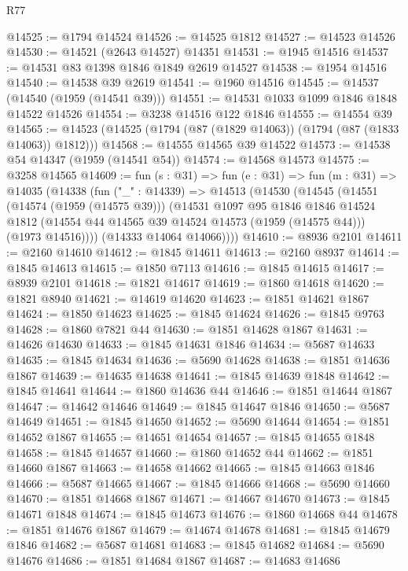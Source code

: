 \begin{lexlean}{R77}
\begin{coremodule}
@14525 := @1794 @14524
@14526 := @14525 @1812
@14527 := @14523 @14526
@14530 := @14521 (@2643 @14527) @14351
@14531 := @1945 @14516
@14537 := @14531 @83 @1398 @1846 @1849 @2619 @14527
@14538 := @1954 @14516
@14540 := @14538 @39 @2619
@14541 := @1960 @14516
@14545 := @14537 (@14540 (@1959 (@14541 @39)))
@14551 := @14531 @1033 @1099 @1846 @1848 @14522 @14526
@14554 := @3238 @14516 @122 @1846
@14555 := @14554 @39
@14565 := @14523 (@14525 (@1794 (@87 (@1829 @14063)) (@1794 (@87 (@1833 @14063)) @1812)))
@14568 := @14555 @14565 @39 @14522
@14573 := @14538 @54 @14347 (@1959 (@14541 @54))
@14574 := @14568 @14573
@14575 := @3258 @14565
@14609 := fun (s : @31) =>
  fun (e : @31) =>
  fun (m : @31) =>
  @14035
    (@14338
      (fun ("_" : @14339) =>
      @14513
        (@14530
          (@14545
            (@14551
              (@14574 (@1959 (@14575 @39)))
              (@14531
                @1097
                @95
                @1846
                @1846
                @14524
                @1812
                (@14554 @44 @14565 @39 @14524 @14573 (@1959 (@14575 @44)))
                (@1973 @14516))))
          (@14333 @14064 @14066))))
@14610 := @8936 @2101
@14611 := @2160 @14610
@14612 := @1845 @14611
@14613 := @2160 @8937
@14614 := @1845 @14613
@14615 := @1850 @7113
@14616 := @1845 @14615
@14617 := @8939 @2101
@14618 := @1821 @14617
@14619 := @1860 @14618
@14620 := @1821 @8940
@14621 := @14619 @14620
@14623 := @1851 @14621 @1867
@14624 := @1850 @14623
@14625 := @1845 @14624
@14626 := @1845 @9763
@14628 := @1860 @7821 @44
@14630 := @1851 @14628 @1867
@14631 := @14626 @14630
@14633 := @1845 @14631 @1846
@14634 := @5687 @14633
@14635 := @1845 @14634
@14636 := @5690 @14628
@14638 := @1851 @14636 @1867
@14639 := @14635 @14638
@14641 := @1845 @14639 @1848
@14642 := @1845 @14641
@14644 := @1860 @14636 @44
@14646 := @1851 @14644 @1867
@14647 := @14642 @14646
@14649 := @1845 @14647 @1846
@14650 := @5687 @14649
@14651 := @1845 @14650
@14652 := @5690 @14644
@14654 := @1851 @14652 @1867
@14655 := @14651 @14654
@14657 := @1845 @14655 @1848
@14658 := @1845 @14657
@14660 := @1860 @14652 @44
@14662 := @1851 @14660 @1867
@14663 := @14658 @14662
@14665 := @1845 @14663 @1846
@14666 := @5687 @14665
@14667 := @1845 @14666
@14668 := @5690 @14660
@14670 := @1851 @14668 @1867
@14671 := @14667 @14670
@14673 := @1845 @14671 @1848
@14674 := @1845 @14673
@14676 := @1860 @14668 @44
@14678 := @1851 @14676 @1867
@14679 := @14674 @14678
@14681 := @1845 @14679 @1846
@14682 := @5687 @14681
@14683 := @1845 @14682
@14684 := @5690 @14676
@14686 := @1851 @14684 @1867
@14687 := @14683 @14686

\end{coremodule}
\end{lexlean}
